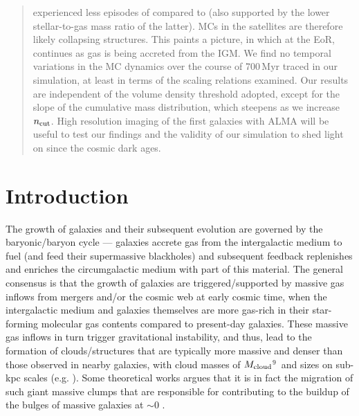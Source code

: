 \documentclass[iop]{emulateapj} %
\begin{document}
\begin{abstract}
experienced less episodes of \SF compared to \flower (also supported by the lower stellar-to-gas mass ratio of the latter).
MCs in the satellites are therefore likely collapsing structures. This paints a picture, in which at the EoR, \SF continues 
as gas is being accreted from the IGM.
We find no temporal variations in the MC dynamics over the course of 700\,Myr traced in our simulation, at least in terms of the scaling relations examined. 
Our results are independent of the volume density threshold adopted, except for the slope of the cumulative 
mass distribution, which steepens as we increase $n_{\rm cut}$. 
High resolution imaging of the first galaxies with ALMA will be useful to test our findings and the validity of our simulation to shed
light on \SF since the cosmic dark ages.
\end{abstract}


\def\figpath{./Fig}

\section{Introduction}    \label{sec:intro}

The growth of galaxies and their subsequent evolution are governed by the baryonic/baryon cycle ---
galaxies accrete gas from the intergalactic medium to fuel \SF (and feed their supermassive blackholes)
and subsequent feedback replenishes and enriches the circumgalactic medium with part of this material.
The general consensus is that the growth of \highz galaxies are triggered/supported by massive
gas inflows from mergers and/or the cosmic web at early cosmic time, when the intergalactic
medium and galaxies themselves are more gas-rich in their star-forming molecular
gas contents compared to present-day galaxies.
These massive gas inflows in turn trigger gravitational instability, and thus, lead
to the formation of clouds/structures that are typically more massive and denser than those
observed in nearby galaxies, with cloud masses of $M_{\rm cloud}$$^9$\,\Msun
and sizes on sub-kpc scales (e.g. \citealt{Gabor13a, Hopkins14a, Inoue16a}).
Some theoretical works argues that it is in fact the
migration of such giant massive clumps that are responsible for contributing to the
buildup of the bulges of massive galaxies at \z$\sim$0 \citep[e.g.,][]{Ceverino10a}.
\end{document}

